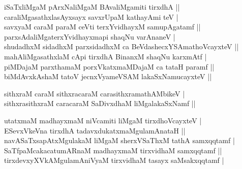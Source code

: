 \begin{entry}
\begin{shl}
iSaTxliMgaM pArxNaliMgaM BAvaliMgamiti tirxdhA ||\\[2pt]
caraliMgasathxlasAyxsayx savxrUpaM kathayAmi teV |\\[2pt]
savxyaM caraM paraM ceVti terxYvidhayxM samupAgatamf ||\\[2pt]
parxsAdaliMgaterxYvidhayxmapi shaqNu varAnaneV |\\[2pt]
shudadhxM sidadhxM parxsidadhxM ca BeVdashecxYSAmathoVcayxteV ||\\[2pt]
mahAliMgasathxlaM cApi tirxdhA BinanxM shaqNu karxmAtf |\\[2pt]
piMDajaM parxthamaM porxVkatxmaMDajaM ca tataH paramf ||\\[2pt]
biMdAvxkAshaM tatoV jecnxVyameVSAM lakaSxNamucayxteV ||\\[-1pt]
\end{shl}
\medskip
{}
\smallskip
{}
\medskip
\begin{shl}
sithxraM caraM sithxracaraM carasithxramathAMbikeV |\\[2pt]
sithxrasithxraM caracaraM SaDivxdhaM liMgalakaSxNamf ||\\[-1pt]
\end{shl}
\medskip
{}
\vskip 5pt
\smallskip
\begin{shl}
utatxmaM madhayxmaM niVcamiti liMgaM tirxdhoVcayxteV |\\[2pt]
ESevxVkeVna tirxdhA tadavxdukatxmaMgulamAnataH ||\\[2pt]
navASaTxsapAtxMgulakaM liMgaM sherxVSaThxM tathA samxqqtamf |\\[2pt]
SaTfpaMcakacatumARnaM madhayxmaM tirxvidhaM samxqqtamf ||\\[2pt]
tirxdevxyXVkAMgulamAniVyaM tirxvidhaM tasayx saMsakxqqtamf |\\[2pt]

\end{shl}
\end{entry}
